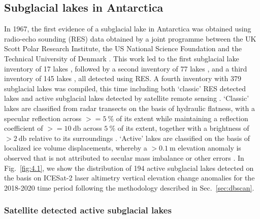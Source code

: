 \subsection{Subglacial lakes in Antarctica}

In 1967, the first evidence of a subglacial lake in Antarctica was obtained using radio-echo sounding (\gls{RES}) data obtained by a joint programme between the UK Scott Polar Research Institute, the US National Science Foundation and the Technical University of Denmark \citep{RobinInterpretationRadioEcho1969}.
This work led to the first subglacial lake inventory of 17 lakes \citep{OswaldLakesAntarcticIce1973}, followed by a second inventory of 77 lakes \citep{SiegertinventoryAntarcticsubglacial1996}, and a third inventory of 145 lakes \citep{SiegertrevisedinventoryAntarctic2005}, all detected using \gls{RES}.
A fourth inventory with 379 subglacial lakes was compiled, this time including both `classic' \gls{RES} detected lakes and active subglacial lakes detected by satellite remote sensing \citep{WrightfourthinventoryAntarctic2012}.
`Classic' lakes are classified from radar transects on the basis of hydraulic flatness, with a specular reflection across $>= \SI{5}{\percent}$ of its extent while maintaining a reflection coefficient of $>= \SI{10}{\decibel}$ across $\SI{5}{\percent}$ of its extent, together with a brightness of $> \SI{2}{\decibel}$ relative to its surroundings \citep{CarterRadarbasedsubglaciallake2007}.
`Active' lakes are classified on the basis of localized ice volume displacements, whereby a $> \SI{0.1}{\metre}$ elevation anomaly is observed that is not attributed to secular mass imbalance or other errors \citep[see][]{Smithinventoryactivesubglacial2009,SiegfriedThirteenyearssubglacial2018}.
In Fig.~\ref{fig:4.1}, we show the distribution of 194 active subglacial lakes detected on the basis on ICESat-2 laser altimetry vertical elevation change anomalies for the 2018-2020 time period following the methodology described in Sec.~\ref{sec:dbscan}.

\subsubsection{Satellite detected active subglacial lakes}

